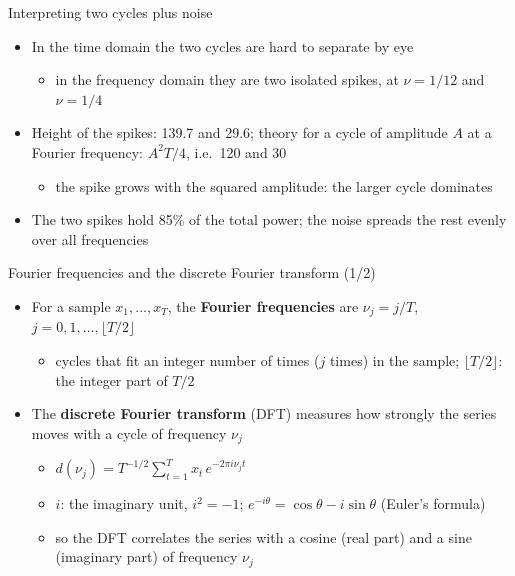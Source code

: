 \begin{frame}{Interpreting two cycles plus noise}
\itemsize{\small}
\begin{itemize}
    \item In the time domain the two cycles are hard to separate by eye
    \begin{itemize}
        \item in the frequency domain they are two isolated spikes, at $\nu = 1/12$ and $\nu = 1/4$
    \end{itemize}
    \item Height of the spikes: 139.7 and 29.6; theory for a cycle of amplitude $A$ at a Fourier frequency: $A^2T/4$, i.e.\ 120 and 30
    \begin{itemize}
        \item the spike grows with the squared amplitude: the larger cycle dominates
    \end{itemize}
    \item The two spikes hold 85\% of the total power; the noise spreads the rest evenly over all frequencies
\end{itemize}
\end{frame}

\begin{frame}{Fourier frequencies and the discrete Fourier transform (1/2)}
\itemsize{\small}
\begin{itemize}
    \item For a sample $x_1, \ldots, x_T$, the \textbf{Fourier frequencies} are $\nu_j = j/T$, $j = 0, 1, \ldots, \lfloor T/2 \rfloor$
    \begin{itemize}
        \item cycles that fit an integer number of times ($j$ times) in the sample; $\lfloor T/2 \rfloor$: the integer part of $T/2$
    \end{itemize}
    \item The \textbf{discrete Fourier transform} (DFT) measures how strongly the series moves with a cycle of frequency $\nu_j$
    \begin{itemize}
        \item $d(\nu_j) = T^{-1/2}\sum_{t=1}^{T} x_t\, e^{-2\pi i \nu_j t}$
        \item $i$: the imaginary unit, $i^2 = -1$; $e^{-i\theta} = \cos\theta - i\sin\theta$ (Euler's formula)
        \item so the DFT correlates the series with a cosine (real part) and a sine (imaginary part) of frequency $\nu_j$
    \end{itemize}
\end{itemize}
\end{frame}

